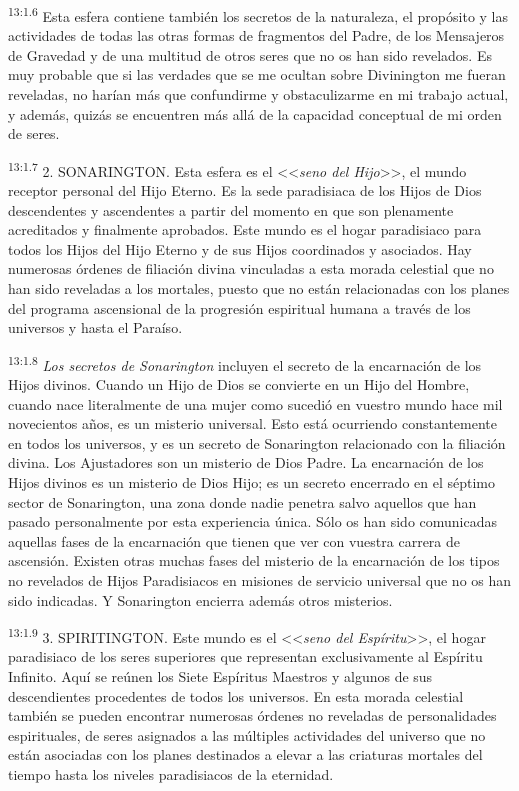 \par
\textsuperscript{13:1.6} Esta esfera contiene también los secretos de la naturaleza, el propósito y las actividades de todas las otras formas de fragmentos del Padre, de los Mensajeros de Gravedad y de una multitud de otros seres que no os han sido revelados. Es muy probable que si las verdades que se me ocultan sobre Divinington me fueran reveladas, no harían más que confundirme y obstaculizarme en mi trabajo actual, y además, quizás se encuentren más allá de la capacidad conceptual de mi orden de seres.

\par
\textsuperscript{13:1.7} 2. SONARINGTON. Esta esfera es el <<\textit{seno del Hijo}>>, el mundo receptor personal del Hijo Eterno. Es la sede paradisiaca de los Hijos de Dios descendentes y ascendentes a partir del momento en que son plenamente acreditados y finalmente aprobados. Este mundo es el hogar paradisiaco para todos los Hijos del Hijo Eterno y de sus Hijos coordinados y asociados. Hay numerosas órdenes de filiación divina vinculadas a esta morada celestial que no han sido reveladas a los mortales, puesto que no están relacionadas con los planes del programa ascensional de la progresión espiritual humana a través de los universos y hasta el Paraíso.

\par
\textsuperscript{13:1.8} \textit{Los secretos de Sonarington} incluyen el secreto de la encarnación de los Hijos divinos. Cuando un Hijo de Dios se convierte en un Hijo del Hombre, cuando nace literalmente de una mujer como sucedió en vuestro mundo hace mil novecientos años, es un misterio universal. Esto está ocurriendo constantemente en todos los universos, y es un secreto de Sonarington relacionado con la filiación divina. Los Ajustadores son un misterio de Dios Padre. La encarnación de los Hijos divinos es un misterio de Dios Hijo; es un secreto encerrado en el séptimo sector de Sonarington, una zona donde nadie penetra salvo aquellos que han pasado personalmente por esta experiencia única. Sólo os han sido comunicadas aquellas fases de la encarnación que tienen que ver con vuestra carrera de ascensión. Existen otras muchas fases del misterio de la encarnación de los tipos no revelados de Hijos Paradisiacos en misiones de servicio universal que no os han sido indicadas. Y Sonarington encierra además otros misterios.

\par
\textsuperscript{13:1.9} 3. SPIRITINGTON. Este mundo es el <<\textit{seno del Espíritu}>>, el hogar paradisiaco de los seres superiores que representan exclusivamente al Espíritu Infinito. Aquí se reúnen los Siete Espíritus Maestros y algunos de sus descendientes procedentes de todos los universos. En esta morada celestial también se pueden encontrar numerosas órdenes no reveladas de personalidades espirituales, de seres asignados a las múltiples actividades del universo que no están asociadas con los planes destinados a elevar a las criaturas mortales del tiempo hasta los niveles paradisiacos de la eternidad.

